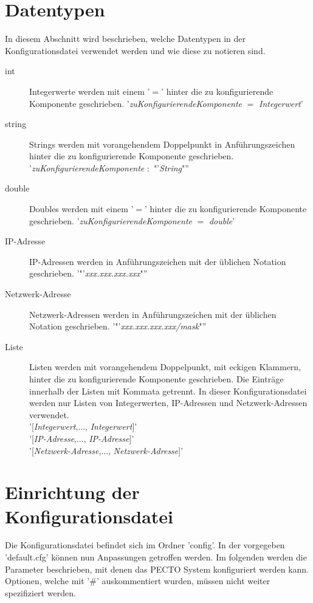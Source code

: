 \documentclass[a4paper, 11pt, ngerman, fleqn]{article}
\begin{document}
\clearpage
\section{Datentypen}
In diesem Abschnitt wird beschrieben, welche Datentypen in der Konfigurationsdatei verwendet werden und wie diese zu notieren sind.
\begin{description}
	\item[int] Integerwerte werden mit einem '$=$' hinter die zu konfigurierende Komponente geschrieben.
				'\textit{zuKonfigurierendeKomponente} $=$ \textit{Integerwert}'
	\item[string] Strings werden mit vorangehendem Doppelpunkt in Anführungszeichen hinter die zu konfigurierende Komponente geschrieben. '\textit{zuKonfigurierendeKomponente} $:$ "'\textit{String}"''
	\item[double] Doubles werden mit einem '$=$' hinter die zu konfigurierende Komponente geschrieben.
					'\textit{zuKonfigurierendeKomponente} $=$ \textit{double}'
	\item[IP-Adresse] IP-Adressen werden in Anführungszeichen mit der üblichen Notation geschrieben. '"'\textit{xxx.xxx.xxx.xxx}"''
	\item[Netzwerk-Adresse] Netzwerk-Adressen werden in Anführungszeichen mit der üblichen Notation geschrieben. '"'\textit{xxx.xxx.xxx.xxx/mask}"''
	\item[Liste] Listen werden mit vorangehendem Doppelpunkt, mit eckigen Klammern, hinter die zu konfigurierende Komponente geschrieben. Die Einträge innerhalb der Listen mit Kommata getrennt. In dieser Konfigurationsdatei werden nur Listen von Integerwerten, IP-Adressen und Netzwerk-Adressen verwendet. \\'[\textit{Integerwert},..., \textit{Integerwert}]'\\ '[\textit{IP-Adresse},..., \textit{IP-Adresse}]'\\ '[\textit{Netzwerk-Adresse},..., \textit{Netzwerk-Adresse}]' 
\end{description}

\section{Einrichtung der Konfigurationsdatei}
Die Konfigurationsdatei befindet sich im Ordner 'config'.
In der vorgegeben 'default.cfg' können nun Anpassungen getroffen werden.
Im folgenden werden die Parameter beschrieben, mit denen das PECTO System konfiguriert werden kann.
Optionen, welche mit '\#' auskommentiert wurden, müssen nicht weiter spezifiziert werden.
\end{document}
